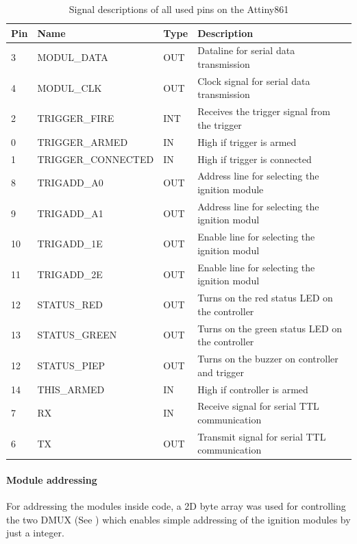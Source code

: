 \begin{table}[!ht]
    \centering
	\begin{tabular}{|l|l|l|l|}\hline
Pin & Name               & Type &Description \\ \hline \hline
3   & MODUL\_DATA        & OUT & Dataline for serial data transmission\\ \hline
4   & MODUL\_CLK         & OUT & Clock signal for serial data transmission\\ \hline
2   & TRIGGER\_FIRE      & INT & Receives the trigger signal from the trigger\\ \hline
0   & TRIGGER\_ARMED     & IN & High if trigger is armed\\ \hline
1   & TRIGGER\_CONNECTED & IN & High if trigger is connected           \\ \hline
8   & TRIGADD\_A0        & OUT & Address line for selecting the ignition module\\ \hline
9   & TRIGADD\_A1        & OUT & Address line for selecting the ignition modul\\ \hline
10  & TRIGADD\_1E        & OUT & Enable line for selecting the ignition modul\\ \hline
11  & TRIGADD\_2E        & OUT & Enable line for selecting the ignition modul\\ \hline
12  & STATUS\_RED        & OUT & Turns on the red status LED on the controller\\ \hline
13  & STATUS\_GREEN      & OUT & Turns on the green status LED on the controller\\ \hline
12  & STATUS\_PIEP       & OUT & Turns on the buzzer on controller and trigger\\ \hline
14  & THIS\_ARMED        & IN & High if controller is armed\\ \hline
7   & RX                 & IN & Receive signal for serial TTL communication\\ \hline
6   & TX                 & OUT & Transmit signal for serial TTL communication\\ \hline
	\end{tabular}
	\caption{Signal descriptions of all used pins on the Attiny861}
	\label{tab:pinio}
\end{table}

\pagebreak

\paragraph{Module addressing}
For addressing the modules inside code, a 2D byte array was used for controlling the two DMUX (See ) which enables simple addressing of the ignition modules by just a integer. 

